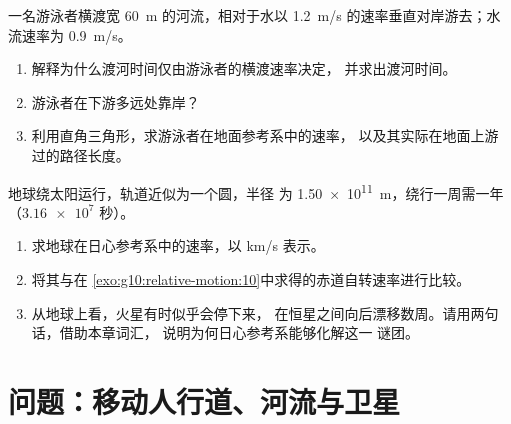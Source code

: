 \begin{exercise}[$\star\star\star$]\label{exo:g10:relative-motion:14}
一名游泳者横渡宽 \qty{60}{m} 的河流，相对于水以
\qty{1.2}{m/s} 的速率垂直对岸游去；水流速率为
\qty{0.9}{m/s}。
\begin{enumerate}
  \item 解释为什么渡河时间仅由游泳者的横渡速率决定，
        并求出渡河时间。
  \item 游泳者在下游多远处靠岸？
  \item 利用直角三角形，求游泳者在地面参考系中的速率，
        以及其实际在地面上游过的路径长度。
\end{enumerate}
\end{exercise}

\begin{exercise}[$\star\star\star$]\label{exo:g10:relative-motion:15}
地球绕太阳运行，轨道近似为一个圆，半径
为 \qty{1.50e11}{m}，绕行一周需一年（$\num{3.16e7}$ 秒）。
\begin{enumerate}
  \item 求地球在日心参考系中的速率，以
        \unit{km/s} 表示。
  \item 将其与在
        \cref{exo:g10:relative-motion:10}中求得的赤道自转速率进行比较。
  \item 从地球上看，火星有时似乎会停下来，
        在恒星之间向后漂移数周。请用两句话，借助本章词汇，
        说明为何日心参考系能够化解这一
        谜团。
\end{enumerate}
\end{exercise}

\section{问题：移动人行道、河流与卫星}

